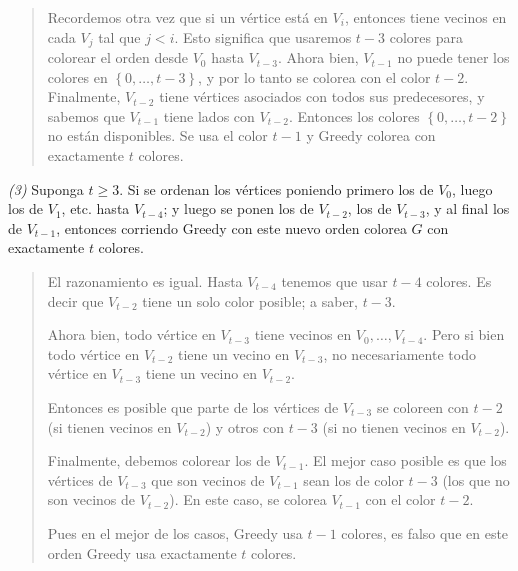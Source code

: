\documentclass[a4paper, 12pt]{article}
\begin{document}
\small
\begin{quote}

    Recordemos otra vez que si un vértice está en $V_i$, entonces tiene vecinos
    en cada $V_{j}$ tal que $j < i$. Esto significa que usaremos $t - 3$ colores
    para colorear el orden desde $V_0$ hasta $V_{t - 3}$. Ahora bien, $V_{t -
    1}$ no puede tener los colores en $\left\{ 0, \ldots, t - 3 \right\} $, y
    por lo tanto se colorea con el color $t - 2$. Finalmente, $V_{t - 2}$ tiene
    vértices asociados con todos sus predecesores, y sabemos que $V_{t - 1}$
    tiene lados con $V_{t - 2}$. Entonces los colores $\left\{ 0, \ldots, t - 2
    \right\} $ no están disponibles. Se usa el color $t - 1$ y Greedy colorea
    con exactamente $t$ colores.

\end{quote}
\normalsize

\textit{(3)} Suponga $t \geq 3$. Si se ordenan los vértices poniendo primero los
de $V_0$, luego los de $V_1$, etc. hasta $V_{t - 4}$; y luego se ponen los de
$V_{t-2}$, los de $V_{t - 3}$, y al final los de $V_{t - 1}$, entonces corriendo
Greedy con este nuevo orden colorea $G$ con exactamente $t$ colores.



\small
\begin{quote}

    El razonamiento es igual. Hasta $V_{t - 4}$ tenemos que usar $t - 4$
    colores. Es decir que $V_{t - 2}$ tiene un solo color posible; a saber, $t -
    3$. 

    Ahora bien, todo vértice en $V_{t - 3}$ tiene vecinos en $V_0, \ldots, V_{t
    - 4}$. Pero si bien todo vértice en $V_{t - 2}$ tiene un vecino en $V_{t -
    3}$, no necesariamente todo vértice en $V_{t -3}$ tiene un vecino en $V_{t
    -2}$. 

    Entonces es posible que parte de los vértices de $V_{t-3}$ se coloreen con
    $t - 2$ (si tienen vecinos en $V_{t-2}$) y otros con $t - 3$ (si no tienen
    vecinos en $V_{t-2}$).

    Finalmente, debemos colorear los de $V_{t - 1}$. El mejor caso posible es
    que los vértices de $V_{t - 3}$ que son vecinos de $V_{t -
    1}$ sean los de color $t - 3$ (los que no son vecinos de $V_{t - 2}$). En
    este caso, se colorea $V_{t - 1}$ con el color $t - 2$.

    Pues en el mejor de los casos, Greedy usa $t - 1$ colores, es falso que en
    este orden Greedy usa exactamente $t$ colores.


\end{quote}
\normalsize
\end{document}
